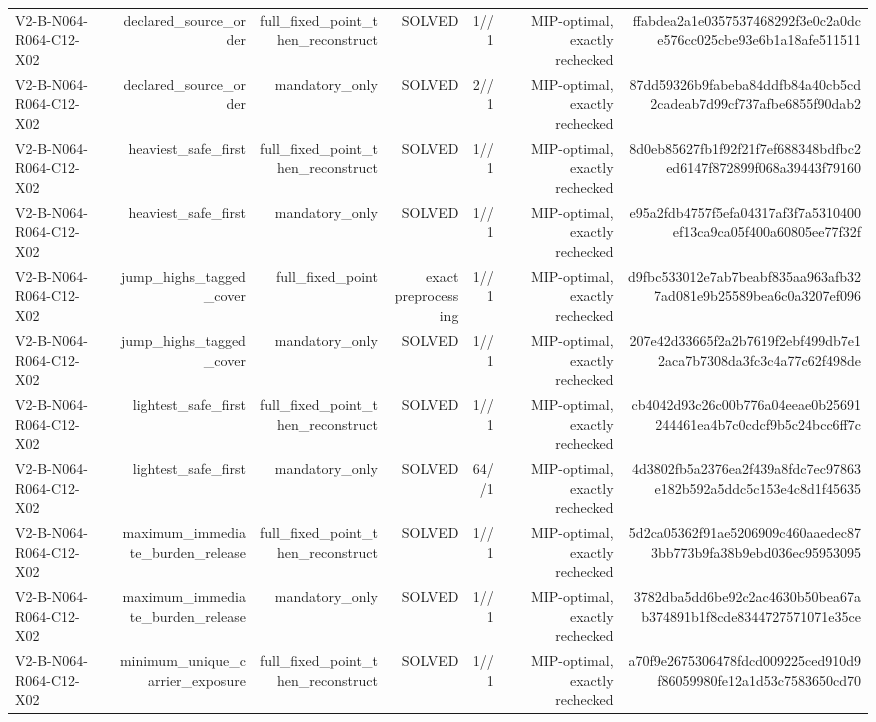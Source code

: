 {\begin{longtable}{lrrrrrr}
V2-B-N064-R064-C12-X02 & declared\_source\_order & full\_fixed\_point\_then\_reconstruct & SOLVED & 1//1 & MIP-optimal, exactly rechecked & ffabdea2a1e0357537468292f3e0c2a0dce576cc025cbe93e6b1a18afe511511 \\
V2-B-N064-R064-C12-X02 & declared\_source\_order & mandatory\_only & SOLVED & 2//1 & MIP-optimal, exactly rechecked & 87dd59326b9fabeba84ddfb84a40cb5cd2cadeab7d99cf737afbe6855f90dab2 \\
V2-B-N064-R064-C12-X02 & heaviest\_safe\_first & full\_fixed\_point\_then\_reconstruct & SOLVED & 1//1 & MIP-optimal, exactly rechecked & 8d0eb85627fb1f92f21f7ef688348bdfbc2ed6147f872899f068a39443f79160 \\
V2-B-N064-R064-C12-X02 & heaviest\_safe\_first & mandatory\_only & SOLVED & 1//1 & MIP-optimal, exactly rechecked & e95a2fdb4757f5efa04317af3f7a5310400ef13ca9ca05f400a60805ee77f32f \\
V2-B-N064-R064-C12-X02 & jump\_highs\_tagged\_cover & full\_fixed\_point & exact preprocessing & 1//1 & MIP-optimal, exactly rechecked & d9fbc533012e7ab7beabf835aa963afb327ad081e9b25589bea6c0a3207ef096 \\
V2-B-N064-R064-C12-X02 & jump\_highs\_tagged\_cover & mandatory\_only & SOLVED & 1//1 & MIP-optimal, exactly rechecked & 207e42d33665f2a2b7619f2ebf499db7e12aca7b7308da3fc3c4a77c62f498de \\
V2-B-N064-R064-C12-X02 & lightest\_safe\_first & full\_fixed\_point\_then\_reconstruct & SOLVED & 1//1 & MIP-optimal, exactly rechecked & cb4042d93c26c00b776a04eeae0b25691244461ea4b7c0cdcf9b5c24bcc6ff7c \\
V2-B-N064-R064-C12-X02 & lightest\_safe\_first & mandatory\_only & SOLVED & 64//1 & MIP-optimal, exactly rechecked & 4d3802fb5a2376ea2f439a8fdc7ec97863e182b592a5ddc5c153e4c8d1f45635 \\
V2-B-N064-R064-C12-X02 & maximum\_immediate\_burden\_release & full\_fixed\_point\_then\_reconstruct & SOLVED & 1//1 & MIP-optimal, exactly rechecked & 5d2ca05362f91ae5206909c460aaedec873bb773b9fa38b9ebd036ec95953095 \\
V2-B-N064-R064-C12-X02 & maximum\_immediate\_burden\_release & mandatory\_only & SOLVED & 1//1 & MIP-optimal, exactly rechecked & 3782dba5dd6be92c2ac4630b50bea67ab374891b1f8cde8344727571071e35ce \\
V2-B-N064-R064-C12-X02 & minimum\_unique\_carrier\_exposure & full\_fixed\_point\_then\_reconstruct & SOLVED & 1//1 & MIP-optimal, exactly rechecked & a70f9e2675306478fdcd009225ced910d9f86059980fe12a1d53c7583650cd70 \\

\end{longtable}}
